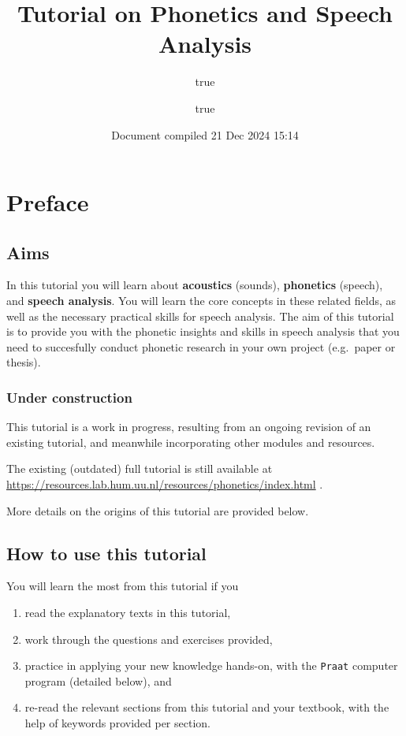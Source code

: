 \documentclass[
]{book}
\title{Tutorial on Phonetics and Speech Analysis}
\author{true \and true}
\date{Document compiled 21 Dec 2024 15:14}
\providecommand{\tightlist}{%
  \setlength{\itemsep}{0pt}\setlength{\parskip}{0pt}}
\begin{document}
\maketitle

{
\setcounter{tocdepth}{1}
\tableofcontents
}
\chapter*{Preface}\label{preface}

\section*{Aims}\label{aims}

In this tutorial you will learn about \textbf{acoustics} (sounds), \textbf{phonetics} (speech), and \textbf{speech analysis}.
You will learn the core concepts in these related fields, as well as the necessary practical skills for speech analysis.
The aim of this tutorial is to provide you with the phonetic insights and skills in speech analysis that you need to succesfully conduct phonetic research in your own project (e.g.~paper or thesis).

\subsection*{Under construction}\label{under-construction}

This tutorial is a work in progress, resulting from an ongoing revision of an existing tutorial, and meanwhile incorporating other modules and resources.

The existing (outdated) full tutorial is still available at \url{https://resources.lab.hum.uu.nl/resources/phonetics/index.html}
.

More details on the origins of this tutorial are provided below.

\section*{How to use this tutorial}\label{how-to-use-this-tutorial}

You will learn the most from this tutorial if you

\begin{enumerate}
\def\labelenumi{(\arabic{enumi})}
\tightlist
\item
  read the explanatory texts in this tutorial,
\item
  work through the questions and exercises provided,
\item
  practice in applying your new knowledge hands-on, with the \texttt{Praat} computer program (detailed below), and
\item
  re-read the relevant sections from this tutorial and your textbook, with the help of keywords provided per section.
\end{enumerate}
\end{document}
